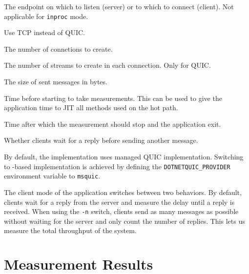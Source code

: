 \begin{description}

     The endpoint on which to listen (server) or to which to connect
(client). Not applicable for \texttt{inproc} mode.



     Use TCP instead of QUIC\@.

     The number of connetions to create.

     The number of streams to create in each connection. Only for QUIC.

     The size of sent messages in bytes.

     Time before starting to take measurements. This can be used to give the application time to JIT all methods used on the hot path.

     Time after which the measurement should stop and the application exit.


     Whether clients wait for a reply before sending another message.

\end{description}

By default, the implementation uses managed QUIC implementation. Switching to \libmsquic{}-based
implementation is achieved by defining the \texttt{DOTNETQUIC_PROVIDER} environment variable to
\texttt{msquic}.

The client mode of the application switches between two behaviors. By default, clients wait for a
reply from the server and measure the delay until a reply is received. When using the \texttt{-n}
switch, clients send as many messages as possible without waiting for the server and only count the
number of replies. This lets us measure the total throughput of the system.

\section{Measurement Results}\label{sec:04-perf-results}

